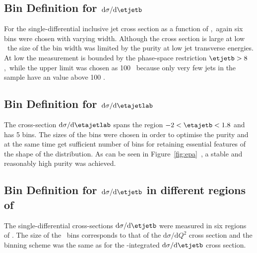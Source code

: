\subsection*{Bin Definition for ${\mathrm{d}\sigma}/{\mathrm{d}\etjetb}$}
\label{subsec:bindefet}
For the single-differential inclusive jet cross section as a function of \etjetb,~again six bins were chosen with varying width. Although the cross section is large at low \etjetb~the size of the bin width was limited by the purity at low jet transverse energies. At low \etjetb the measurement is bounded by the phase-space restriction $\etjetb > 8$ \GeV,~while the upper limit was chosen as 100 \GeV~because only very few jets in the sample have an \etjetb value above 100 \GeV.
\subsection*{Bin Definition for ${\mathrm{d}\sigma}/{\mathrm{d}\etajetlab}$}
\label{subsec:bindefeta}
The cross-section ${\mathrm{d}\sigma}/{\mathrm{d}\etajetlab}$ spans the region $-2<\etajetb<1.8$ and has 5 bins. The sizes of the bins were chosen in order to optimise the purity and at the same time get sufficient number of bins for retaining essential features of the shape of the distribution. As can be seen in Figure~\ref{fig:epa}~, a stable and reasonably high purity was achieved.
\subsection*{Bin Definition for ${\mathrm{d}\sigma}/{\mathrm{d}\etjetb}$ in different regions of \qsq}
\label{subsec:bindefetinq2}
The single-differential cross-sections ${\mathrm{d}\sigma}/{\mathrm{d}\etjetb}$ were measured in six regions of \qsq. The size of the \qsq~bins corresponds to that of the ${\mathrm{d}\sigma}/{\mathrm{d}Q^2}$ cross section and the \etjetb binning scheme was the same as for the \qsq-integrated ${\mathrm{d}\sigma}/{\mathrm{d}\etjetb}$ cross section.


